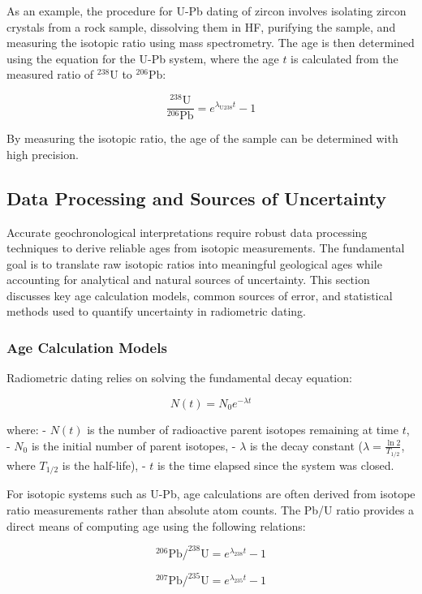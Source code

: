 \documentclass{article}
\begin{document}
As an example, the procedure for U-Pb dating of zircon involves isolating zircon crystals from a rock sample, dissolving them in HF, purifying the sample, and measuring the isotopic ratio using mass spectrometry. The age is then determined using the equation for the U-Pb system, where the age \( t \) is calculated from the measured ratio of \(^{238}\text{U}\) to \(^{206}\text{Pb}\):

\[
\frac{^{238}\text{U}}{^{206}\text{Pb}} = e^{\lambda_{\text{U238}} t} - 1
\]

By measuring the isotopic ratio, the age of the sample can be determined with high precision.

\subsection{Data Processing and Sources of Uncertainty}

Accurate geochronological interpretations require robust data processing techniques to derive reliable ages from isotopic measurements. The fundamental goal is to translate raw isotopic ratios into meaningful geological ages while accounting for analytical and natural sources of uncertainty. This section discusses key age calculation models, common sources of error, and statistical methods used to quantify uncertainty in radiometric dating.

\subsubsection*{Age Calculation Models}

Radiometric dating relies on solving the fundamental decay equation:

\[
N(t) = N_0 e^{-\lambda t}
\]

where:
- \( N(t) \) is the number of radioactive parent isotopes remaining at time \( t \),
- \( N_0 \) is the initial number of parent isotopes,
- \( \lambda \) is the decay constant (\(\lambda = \frac{\ln 2}{T_{1/2}}\), where \(T_{1/2}\) is the half-life),
- \( t \) is the time elapsed since the system was closed.

For isotopic systems such as U-Pb, age calculations are often derived from isotope ratio measurements rather than absolute atom counts. The Pb/U ratio provides a direct means of computing age using the following relations:

\[
^{206}\text{Pb}/^{238}\text{U} = e^{\lambda_{238} t} - 1
\]

\[
^{207}\text{Pb}/^{235}\text{U} = e^{\lambda_{235} t} - 1
\]
\end{document}
